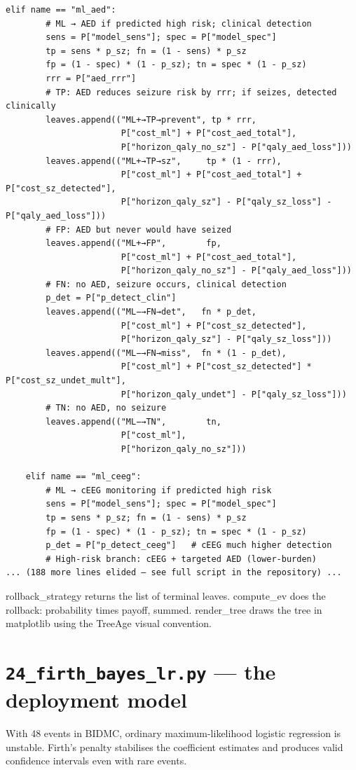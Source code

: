 \documentclass[11pt,a4paper]{article}
\begin{document}
\begin{lstlisting}[style=codeblock]
    elif name == "ml_aed":
        # ML → AED if predicted high risk; clinical detection
        sens = P["model_sens"]; spec = P["model_spec"]
        tp = sens * p_sz; fn = (1 - sens) * p_sz
        fp = (1 - spec) * (1 - p_sz); tn = spec * (1 - p_sz)
        rrr = P["aed_rrr"]
        # TP: AED reduces seizure risk by rrr; if seizes, detected clinically
        leaves.append(("ML+→TP→prevent", tp * rrr,
                       P["cost_ml"] + P["cost_aed_total"],
                       P["horizon_qaly_no_sz"] - P["qaly_aed_loss"]))
        leaves.append(("ML+→TP→sz",     tp * (1 - rrr),
                       P["cost_ml"] + P["cost_aed_total"] + P["cost_sz_detected"],
                       P["horizon_qaly_sz"] - P["qaly_sz_loss"] - P["qaly_aed_loss"]))
        # FP: AED but never would have seized
        leaves.append(("ML+→FP",        fp,
                       P["cost_ml"] + P["cost_aed_total"],
                       P["horizon_qaly_no_sz"] - P["qaly_aed_loss"]))
        # FN: no AED, seizure occurs, clinical detection
        p_det = P["p_detect_clin"]
        leaves.append(("ML−→FN→det",   fn * p_det,
                       P["cost_ml"] + P["cost_sz_detected"],
                       P["horizon_qaly_sz"] - P["qaly_sz_loss"]))
        leaves.append(("ML−→FN→miss",  fn * (1 - p_det),
                       P["cost_ml"] + P["cost_sz_detected"] * P["cost_sz_undet_mult"],
                       P["horizon_qaly_undet"] - P["qaly_sz_loss"]))
        # TN: no AED, no seizure
        leaves.append(("ML−→TN",        tn,
                       P["cost_ml"],
                       P["horizon_qaly_no_sz"]))

    elif name == "ml_ceeg":
        # ML → cEEG monitoring if predicted high risk
        sens = P["model_sens"]; spec = P["model_spec"]
        tp = sens * p_sz; fn = (1 - sens) * p_sz
        fp = (1 - spec) * (1 - p_sz); tn = spec * (1 - p_sz)
        p_det = P["p_detect_ceeg"]   # cEEG much higher detection
        # High-risk branch: cEEG + targeted AED (lower-burden)
... (188 more lines elided — see full script in the repository) ...
\end{lstlisting}

rollback\_strategy returns the list of terminal leaves. compute\_ev does the rollback: probability times payoff, summed. render\_tree draws the tree in matplotlib using the TreeAge visual convention.
\clearpage
\section{\texttt{24\_firth\_bayes\_lr.py} — the deployment model}
With 48 events in BIDMC, ordinary maximum-likelihood logistic regression is unstable. Firth's penalty stabilises the coefficient estimates and produces valid confidence intervals even with rare events.
\end{document}
